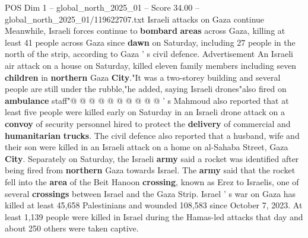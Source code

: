 \begin{textsample}{POS Dim 1 – global\_north\_2025\_01 – Score 34.00 – global\_north\_2025\_01/119622707.txt}
Israeli attacks on Gaza continue Meanwhile, Israeli forces continue to \textbf{bombard} \textbf{areas} across Gaza, killing at least 41 people across Gaza since \textbf{dawn} on Saturday, including 27 people in the north of the strip, according to Gaza ' s civil defence.
Advertisement An Israeli air attack on a house on Saturday, killed eleven family members including seven \textbf{children} in \textbf{northern} Gaza \textbf{City}."It was a two-storey building and several people are still under the rubble,"he added, saying Israeli drones"also fired on \textbf{ambulance} staff"@ @ @ @ @ @ @ @ @ @ ' s Mahmoud also reported that at least five people were killed early on Saturday in an Israeli drone attack on a \textbf{convoy} of security personnel hired to protect the \textbf{delivery} of commercial and \textbf{humanitarian} \textbf{trucks}.
The civil defence also reported that a husband, wife and their son were killed in an Israeli attack on a home on al-Sahaba Street, Gaza \textbf{City}.
Separately on Saturday, the Israeli \textbf{army} said a rocket was identified after being fired from \textbf{northern} Gaza towards Israel.
The \textbf{army} said that the rocket fell into the \textbf{area} of the Beit Hanoon \textbf{crossing}, known as Erez to Israelis, one of several \textbf{crossings} between Israel and the Gaza Strip.
Israel ' s war on Gaza has killed at least 45,658 Palestinians and wounded 108,583 since October 7, 2023.
At least 1,139 people were killed in Israel during the Hamas-led attacks that day and about 250 others were taken captive.

\end{textsample}
